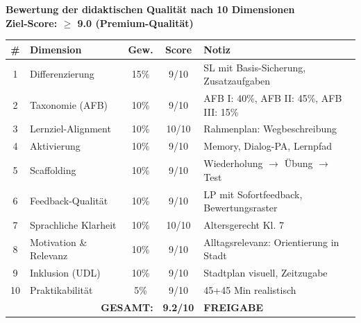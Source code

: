 \documentclass[11pt,a4paper]{article}
\begin{document}
\begin{scorebox}
\textbf{Bewertung der didaktischen Qualität nach 10 Dimensionen}\\
\textbf{Ziel-Score: $\geq$ 9.0 (Premium-Qualität)}

\vspace{1em}
\begin{tabular}{|c|l|c|c|p{4.5cm}|}
\hline
\textbf{\#} & \textbf{Dimension} & \textbf{Gew.} & \textbf{Score} & \textbf{Notiz} \\
\hline
1 & Differenzierung & 15\% & 9/10 & SL mit Basis-Sicherung, Zusatzaufgaben \\
\hline
2 & Taxonomie (AFB) & 10\% & 9/10 & AFB I: 40\%, AFB II: 45\%, AFB III: 15\% \\
\hline
3 & Lernziel-Alignment & 10\% & 10/10 & Rahmenplan: Wegbeschreibung \\
\hline
4 & Aktivierung & 10\% & 9/10 & Memory, Dialog-PA, Lernpfad \\
\hline
5 & Scaffolding & 10\% & 9/10 & Wiederholung $\rightarrow$ Übung $\rightarrow$ Test \\
\hline
6 & Feedback-Qualität & 10\% & 9/10 & LP mit Sofortfeedback, Bewertungsraster \\
\hline
7 & Sprachliche Klarheit & 10\% & 10/10 & Altersgerecht Kl. 7 \\
\hline
8 & Motivation \& Relevanz & 10\% & 9/10 & Alltagsrelevanz: Orientierung in Stadt \\
\hline
9 & Inklusion (UDL) & 10\% & 9/10 & Stadtplan visuell, Zeitzugabe \\
\hline
10 & Praktikabilität & 5\% & 9/10 & 45+45 Min realistisch \\
\hline
\multicolumn{3}{|r|}{\textbf{GESAMT:}} & \textbf{9.2/10} & \textcolor{successgreen}{\textbf{FREIGABE}} \\
\hline
\end{tabular}
\end{scorebox}
\end{document}
